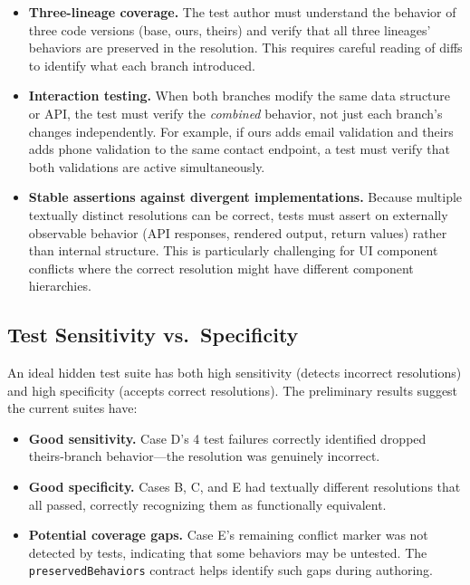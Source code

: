 \documentclass[11pt,a4paper]{article}
\begin{document}
\begin{itemize}[leftmargin=2em]
\item \textbf{Three-lineage coverage.} The test author must understand the behavior of three code versions (base, ours, theirs) and verify that all three lineages' behaviors are preserved in the resolution. This requires careful reading of diffs to identify what each branch introduced.

\item \textbf{Interaction testing.} When both branches modify the same data structure or API, the test must verify the \emph{combined} behavior, not just each branch's changes independently. For example, if ours adds email validation and theirs adds phone validation to the same contact endpoint, a test must verify that both validations are active simultaneously.

\item \textbf{Stable assertions against divergent implementations.} Because multiple textually distinct resolutions can be correct, tests must assert on externally observable behavior (API responses, rendered output, return values) rather than internal structure. This is particularly challenging for UI component conflicts where the correct resolution might have different component hierarchies.
\end{itemize}

\subsection{Test Sensitivity vs.\ Specificity}

An ideal hidden test suite has both high sensitivity (detects incorrect resolutions) and high specificity (accepts correct resolutions). The preliminary results suggest the current suites have:

\begin{itemize}[leftmargin=2em]
\item \textbf{Good sensitivity.} Case D's 4 test failures correctly identified dropped theirs-branch behavior---the resolution was genuinely incorrect.
\item \textbf{Good specificity.} Cases B, C, and E had textually different resolutions that all passed, correctly recognizing them as functionally equivalent.
\item \textbf{Potential coverage gaps.} Case E's remaining conflict marker was not detected by tests, indicating that some behaviors may be untested. The \texttt{preservedBehaviors} contract helps identify such gaps during authoring.
\end{itemize}
\end{document}
